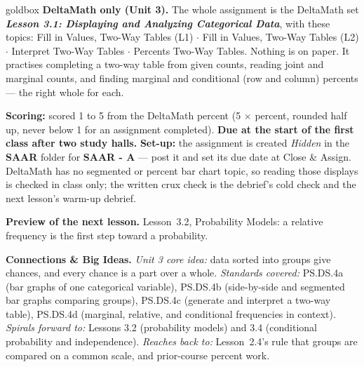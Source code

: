 \documentclass[10pt]{article}
\begin{document}
\boxguard
\begin{skillbox}{goldbox}
\textbf{DeltaMath only (Unit 3).} The whole assignment is the DeltaMath set \textbf{\emph{Lesson
3.1: Displaying and Analyzing Categorical Data}}, with these topics: Fill in Values, Two-Way
Tables (L1) $\cdot$ Fill in Values, Two-Way Tables (L2) $\cdot$ Interpret Two-Way Tables $\cdot$
Percents Two-Way Tables. Nothing is on paper. It practises completing a two-way table from given
counts, reading joint and marginal counts, and finding marginal and conditional (row and column)
percents --- the right whole for each.

\textbf{Scoring:} scored 1 to 5 from the DeltaMath percent (5 $\times$ percent, rounded half up,
never below 1 for an assignment completed). \textbf{Due at the start of the first class after two
study halls.} \textbf{Set-up:} the assignment is created \emph{Hidden} in the \textbf{SAAR}
folder for \textbf{SAAR - A} --- post it and set its due date at Close \& Assign. DeltaMath has no
segmented or percent bar chart topic, so reading those displays is checked in class only; the
written crux check is the debrief's cold check and the next lesson's warm-up debrief.

\textbf{Preview of the next lesson.} Lesson~3.2, Probability Models: a relative frequency is the
first step toward a probability.

\textbf{Connections \& Big Ideas.} \textit{Unit 3 core idea:} data sorted into groups give chances,
and every chance is a part over a whole. \textit{Standards covered:} PS.DS.4a (bar graphs of one
categorical variable), PS.DS.4b (side-by-side and segmented bar graphs comparing groups),
PS.DS.4c (generate and interpret a two-way table), PS.DS.4d (marginal, relative, and conditional
frequencies in context). \textit{Spirals forward to:} Lessons 3.2 (probability models) and 3.4
(conditional probability and independence). \textit{Reaches back to:} Lesson~2.4's rule that
groups are compared on a common scale, and prior-course percent work.
\end{skillbox}
\end{document}
